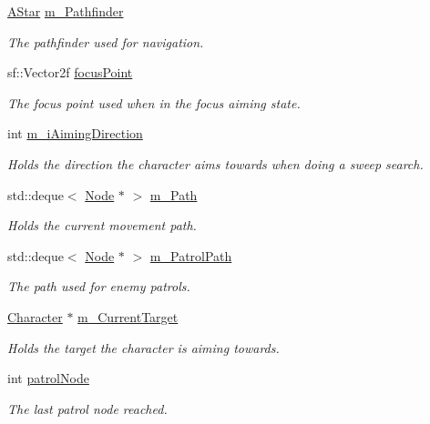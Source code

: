 \begin{DoxyCompactItemize}
\hyperlink{class_a_star}{A\+Star} \hyperlink{class_character_a83fbc0831e0d59f349a3eab305d74965}{m\+\_\+\+Pathfinder}
\begin{DoxyCompactList}\small\item\em The pathfinder used for navigation. \end{DoxyCompactList}\item 
sf\+::\+Vector2f \hyperlink{class_character_a7f43ba27a490f5e80f9103b8e7e00e20}{focus\+Point}
\begin{DoxyCompactList}\small\item\em The focus point used when in the focus aiming state. \end{DoxyCompactList}\item 
int \hyperlink{class_character_a829ad896de47ffa2fd74c942feb0d9fa}{m\+\_\+i\+Aiming\+Direction}
\begin{DoxyCompactList}\small\item\em Holds the direction the character aims towards when doing a sweep search. \end{DoxyCompactList}\item 
std\+::deque$<$ \hyperlink{struct_node}{Node} $\ast$ $>$ \hyperlink{class_character_a8aa67eb094307c8645c245e1c999cff8}{m\+\_\+\+Path}
\begin{DoxyCompactList}\small\item\em Holds the current movement path. \end{DoxyCompactList}\item 
std\+::deque$<$ \hyperlink{struct_node}{Node} $\ast$ $>$ \hyperlink{class_character_ad792c539b12f981bcb78f8b0e9c78eb5}{m\+\_\+\+Patrol\+Path}
\begin{DoxyCompactList}\small\item\em The path used for enemy patrols. \end{DoxyCompactList}\item 
\hyperlink{class_character}{Character} $\ast$ \hyperlink{class_character_ad9a0c6940df7fc13abd6ac2404b058b3}{m\+\_\+\+Current\+Target}
\begin{DoxyCompactList}\small\item\em Holds the target the character is aiming towards. \end{DoxyCompactList}\item 
int \hyperlink{class_character_ae7e67233ca5f5577676cd83f5d2a847f}{patrol\+Node}
\begin{DoxyCompactList}\small\item\em The last patrol node reached. \end{DoxyCompactList}\item 

\end{DoxyCompactItemize}
